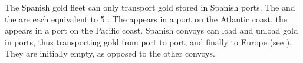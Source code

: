 \label{chIncomes:SpanishConvoys} The Spanish gold
fleet can only transport gold stored in Spanish ports. The  and the  are each equivalent to 5 \NTD.
\bparag The  appears in a port on the Atlantic coast, the
 appears in a port on the Pacific coast.
\bparag Spanish convoys can load and unload gold in ports, thus transporting
gold from port to port, and finally to Europe (see
). They are initially empty, as opposed
to the other convoys.




